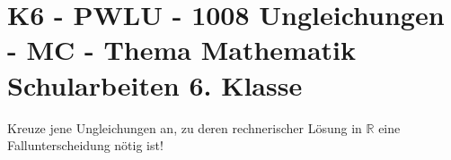 \section{K6 - PWLU - 1008 Ungleichungen - MC - Thema Mathematik Schularbeiten 6. Klasse}

\begin{beispiel}[K6 - PWLU]{1} %
			Kreuze jene Ungleichungen an, zu deren rechnerischer Lösung in $\mathbb{R}$ eine Fallunterscheidung nötig ist!
			
							\end{beispiel}